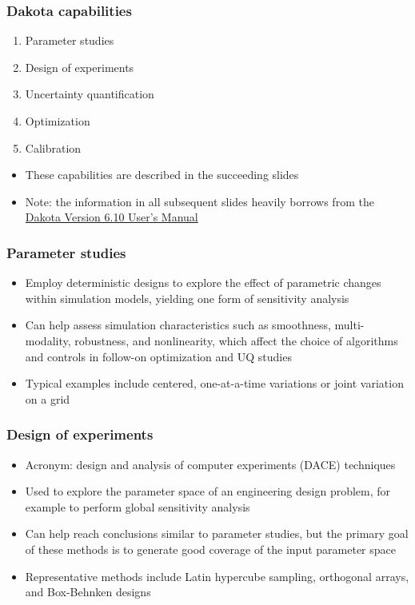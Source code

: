 \documentclass[t]{beamer}
\begin{document}

\begin{frame}
  \frametitle{Dakota capabilities}
  \begin{enumerate}[1]
    \item Parameter studies
    \item Design of experiments
    \item Uncertainty quantification
    \item Optimization
    \item Calibration
  \end{enumerate}
  \vskip 10mm
  \begin{itemize}
    \item These capabilities are described in the succeeding slides
    \item Note: the information in all subsequent slides heavily borrows from
          the \href{https://dakota.sandia.gov/content/manuals}{Dakota Version
          6.10 User's Manual}
  \end{itemize}
\end{frame}


\begin{frame}
  \frametitle{Parameter studies}
  \begin{itemize}
    \item Employ deterministic designs to explore the effect of parametric
          changes within simulation models, yielding one form of sensitivity
          analysis
    \item Can help assess simulation characteristics such as smoothness,
          multi-modality, robustness, and nonlinearity, which affect the choice
          of algorithms and controls in follow-on optimization and UQ studies
    \item Typical examples include centered, one-at-a-time variations or joint
          variation on a grid
  \end{itemize}
\end{frame}


\begin{frame}
  \frametitle{Design of experiments}
  \begin{itemize}
    \item Acronym: design and analysis of computer experiments (DACE) techniques
    \item Used to explore the parameter space of an engineering design problem,
          for example to perform global sensitivity analysis
    \item Can help reach conclusions similar to parameter studies, but the
          primary goal of these methods is to generate good coverage of the
          input parameter space
    \item Representative methods include Latin hypercube sampling, orthogonal
          arrays, and Box-Behnken designs
  \end{itemize}
\end{frame}
\end{document}
